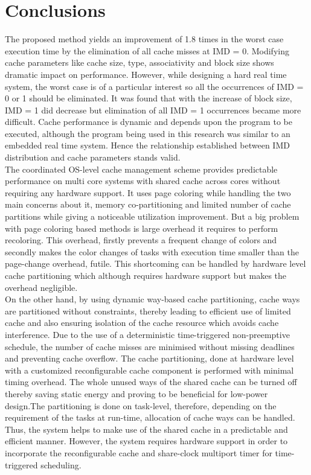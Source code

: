 \documentclass[conference]{IEEEtran}
\begin{document}
\section{Conclusions}
    The proposed method\cite{b1} yields an improvement of 1.8 times in the worst case execution time by the elimination of all cache misses at IMD = 0. Modifying cache parameters like cache size, type, associativity and block size shows dramatic impact on performance. However, while designing a hard real time system, the worst case is of a particular interest so all the occurrences of IMD = 0 or 1 should be eliminated. It was found that with the increase of block size, IMD = 1 did decrease but elimination of all IMD = 1 occurrences became more difficult. Cache performance is dynamic and depends upon the program to be executed, although the program being used in this research was similar to an embedded real time system. Hence the relationship established between IMD distribution and cache parameters stands valid.\\
    \newline
    The coordinated OS-level cache management\cite{b2} scheme provides predictable performance on multi core systems with shared cache across cores without requiring any hardware support. It uses page coloring while handling the two main concerns about it, memory co-partitioning and limited number of cache partitions while giving a noticeable utilization improvement.
    But a big problem with page coloring based methods is large overhead it requires to perform recoloring. This overhead, firstly prevents a frequent change of colors and secondly makes the color changes of tasks with execution time smaller than the page-change overhead, futile. This shortcoming can be handled by hardware level cache partitioning which although requires hardware support but makes the overhead negligible.\\
    \newline
    On the other hand, by using dynamic way-based cache partitioning\cite{b3}, cache ways are partitioned without constraints, thereby leading to efficient use of limited cache and also ensuring isolation of the cache resource which avoids cache interference. Due to the use of a deterministic time-triggered non-preemptive schedule, the number of cache misses are minimised without missing deadlines and preventing cache overflow. The cache partitioning, done at hardware level with a customized reconfigurable cache component is performed with minimal timing overhead. The whole unused ways of the shared cache can be turned off thereby saving static energy and proving to be beneficial for low-power design.The partitioning is done on task-level, therefore, depending on the requirement of the tasks at run-time, allocation of cache ways can be handled. Thus, the system helps to make use of the shared cache in a predictable and efficient manner. However, the system requires hardware support in order to incorporate the reconfigurable cache and share-clock multiport timer for time-triggered scheduling.\\
\end{document}

